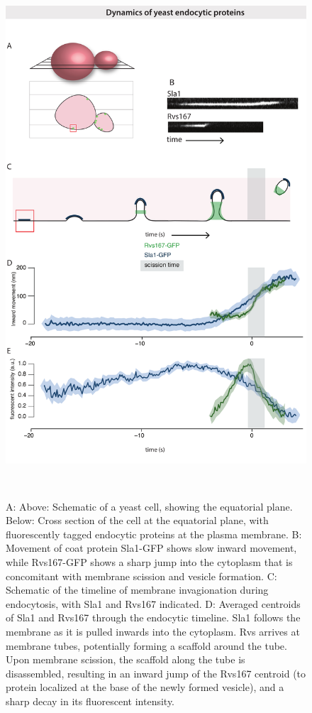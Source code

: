 	\begin{figure}
	\centering
	\includegraphics[width=19.5cm,height=19.5cm,keepaspectratio, valign=t]{figures/results_final/yeast_schemat_fig1_C}
	\caption[Centroid tracking yeast endocytic proteins]
	{A: Above: Schematic of a yeast cell, showing the equatorial plane. Below: Cross section of the cell at the equatorial plane, with fluorescently tagged endocytic proteins at the plasma membrane. B: Movement of coat protein Sla1-GFP shows slow inward movement, while Rvs167-GFP shows a sharp jump into the cytoplasm that is concomitant with membrane scission and vesicle formation.
	C: Schematic of the timeline of membrane invagionation during endocytosis, with Sla1 and Rvs167 indicated. D: Averaged centroids of Sla1 and Rvs167 through the endocytic timeline. Sla1 follows the membrane as it is pulled inwards into the cytoplasm. Rvs arrives at membrane tubes, potentially forming a scaffold around the tube. Upon membrane scission, the scaffold along the tube is disassembled, resulting in an inward jump of the Rvs167 centroid (to protein localized at the base of the newly formed vesicle), and a sharp decay in its fluorescent intensity. 
	\label{fig1_schematic}}
	\end{figure}

